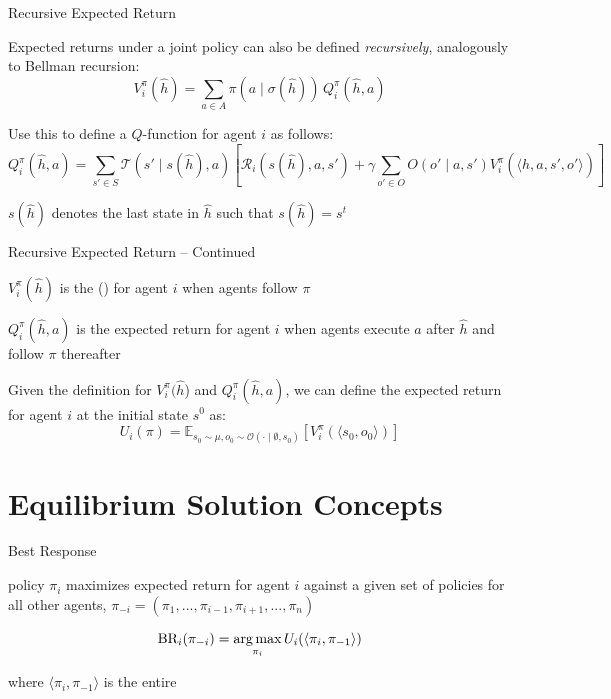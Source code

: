 \begin{frame}{Recursive Expected Return}

    Expected returns under a joint policy can also be defined {\it recursively}, analogously to Bellman recursion:
    \[
        V^{\pi}_i(\hat{h}) = \sum_{a \in A} \pi(a \mid \sigma(\hat{h})) \, Q^{\pi}_i (\hat{h}, a)
    \]

	\vspace{5pt}

    Use this to define a $Q$-function for agent \(i\) as follows:
    \[
        Q^{\pi}_i(\hat{h}, a) = \sum_{s' \in S} \mathcal{T}(s' \mid s(\hat{h}), a) \left[ \mathcal{R}_i(s(\hat{h}), a, s') + \gamma \sum_{o' \in O} O(o' \mid a, s') V^{\pi}_i(\langle \hat{h}, a, s', o'\rangle) \right]
    \]

    \blist
        \item \(s(\hat{h})\) denotes the last state in \(\hat{h}\) such that \(s(\hat{h}) = s^t\)
    \elist
    
\end{frame}

\begin{frame}{Recursive Expected Return -- Continued}

    \blist
    	\itemsep=10pt
        \item \(V^{\pi}_i(\hat{h})\) is the  () for agent \(i\) when agents follow  \(\pi\)
        \item \(Q^{\pi}_i(\hat{h}, a)\) is the expected return for agent \(i\) when agents execute  \(a\) after \(\hat{h}\) and follow \(\pi\) thereafter
        \item Given the definition for \(V^{\pi}_i(\hat{h}\)) and  \(Q^{\pi}_i(\hat{h}, a)\), we can define the expected return for agent \(i\) at the initial state \(s^0\) as:
    \elist
    \vspace{2pt}
    \[
    U_i(\pi) = \mathbb{E}_{s_0 \sim \mu, o_0 \sim \mathcal{O}(\cdot \mid \emptyset,  s_0)} \left[ V^{\pi}_i(\langle s_0, o_0 \rangle) \right]
    \]
    
\end{frame}


\section{Equilibrium Solution Concepts}

\begin{frame}{Best Response}

\begin{bluebox}
	 policy $\pi_i$ maximizes expected return for agent \(i\) against a given set of policies for all other agents, \(\pi_{-i} = (\pi_1, ..., \pi_{i-1}, \pi_{i+1}, ..., \pi_{n})\)
    
    $$\text{BR}_i(\pi_{-i}) = \operatorname*{arg\,max}_{\pi_{i}} U_i(\langle\pi_i, \pi_{-1}\rangle)$$
        
    where $\langle\pi_i, \pi_{-1}\rangle$ is the entire 
\end{bluebox}

\end{frame}

